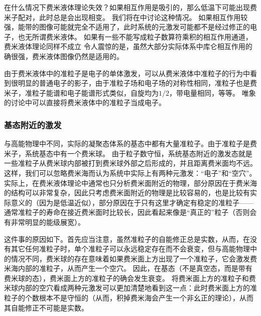 \documentclass[hyperref, UTF8, a4paper]{ctexart}
\renewcommand{\autoref}{\prettyref}
\begin{document}
在什么情况下费米液体理论失效？如果相互作用是吸引的，那么低温下可能出现费米子配对，此时总是会出现相变。
我们将在\autoref{sec:gl-transition}中讨论这种情况。
如果相互作用较强，能带的图像可能就完全不适用了，此时系统的元激发可能都不是经过修正的电子，也无所谓费米液体。
如果有一些不能写成粒子数算符乘积的相互作用通道，费米液体理论同样不成立
令人震惊的是，虽然大部分实际体系中库仑相互作用的确很强，费米液体图像仍然是适用的。

由于费米液体中的准粒子是电子的单体激发，可以从费米液体中准粒子的行为中看到很明显的普通电子的影子，由于准粒子场和电子场的对称性相同，准粒子也是费米子，准粒子能谱和电子能谱形式类似，自旋均为$1/2$，带电量相同，等等。
唯象的讨论中可以直接将费米液体中的准粒子当成电子。

\subsubsection{基态附近的激发}\label{sec:fermi-liquid-ground}

与高能物理中不同，实际的凝聚态体系的基态中都有大量准粒子。由于准粒子是费米子，系统基态中有一个费米球。
由于粒子数守恒，系统基态附近的激发态就是一些准粒子从费米球内部被打到费米球外部之后形成的，并且距离费米面均不远。
这样，我们可以忽略费米海而认为系统中实际上有两种元激发：“电子”和“空穴”。
实际上，在费米液体理论中通常也只分析费米面附近的物理，部分原因在于费米海的结构可以非常复杂，因此只考虑费米面附近的物理是比较容易的，也是比较有实际意义的（因为是低温近似），部分原因在于只有这里才确定有稳定的准粒子——通常准粒子的寿命在接近费米面时比较长，因此看起来像是“真正的”粒子（否则会有非常明显的能级展宽）。

这件事的原因如下。首先应当注意，虽然准粒子的自能修正总是实数，从而，在没有其它任何准粒子时，单个准粒子可以永远稳定存在而不会衰变，但与高能物理中的情况不同，费米球的存在意味着如果费米面上方出现了一个准粒子，它会激发费米海内部的准粒子，从而产生一个空穴。
因此，在基态（不是真空态，而是带有费米球的态），费米面上方的准粒子的确会发生衰变。
将费米面上方的准粒子和费米球内部的空穴看成两种元激发可以更加清楚地看到这一点：此时费米面上方的准粒子的个数根本不是守恒的（从而，积掉费米海会产生一个非幺正的理论），从而其自能修正不可能是实数。
\end{document}
